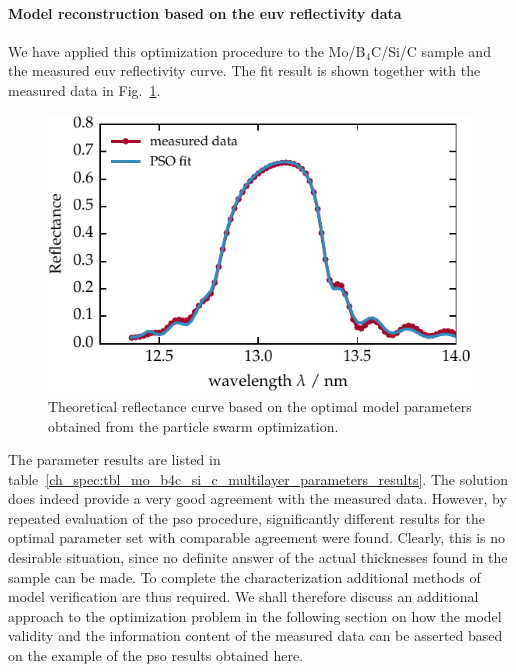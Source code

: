 \paragraph{Model reconstruction based on the \gls{euv} reflectivity data}
We have applied this optimization procedure to the Mo/B$_4$C/Si/C sample and the measured \gls{euv} reflectivity curve. The fit result is shown together with the measured data in Fig.~\ref{ch_spec:fig_ptb17_reflectance_AOI_15_fitted}.
\begin{figure}[htbp]
\centering
\includegraphics{img/PTB17_reflectance_AOI_15_fitted}
\caption{Theoretical reflectance curve based on the optimal model parameters obtained from the particle swarm optimization.}
\label{ch_spec:fig_ptb17_reflectance_AOI_15_fitted}
\end{figure}
The parameter results are listed in table~\ref{ch_spec:tbl_mo_b4c_si_c_multilayer_parameters_results}. The solution does indeed provide a very good agreement with the measured data. However, by repeated evaluation of the \gls{pso} procedure, significantly different results for the optimal parameter set with comparable agreement were found. Clearly, this is no desirable situation, since no definite answer of the actual thicknesses found in the sample can be made. To complete the characterization additional methods of model verification are thus required. We shall therefore discuss an additional approach to the optimization problem in the following section on how the model validity and the information content of the measured data can be asserted based on the example of the \gls{pso} results obtained here.
